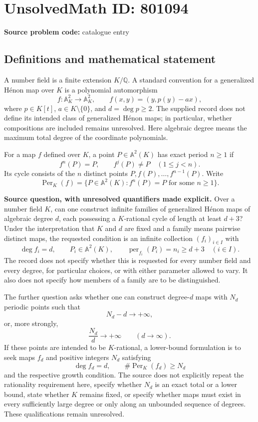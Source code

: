 \documentclass[11pt]{article}
\newcommand{\Q}{\mathbb{Q}}
\newcommand{\A}{\mathbb{A}}
\begin{document}
\section*{UnsolvedMath ID: 801094}
\textbf{Source problem code:} catalogue entry
\subsection{Definitions and mathematical statement}
A number field is a finite extension \(K/\Q\). A standard convention for a generalized H\'{e}non map over \(K\) is a polynomial automorphism
\[
f:\A^2_K\longrightarrow\A^2_K,\qquad f(x,y)=(y,p(y)-ax),
\]
where \(p\in K[t]\), \(a\in K\setminus\{0\}\), and \(d=\deg p\ge 2\). The supplied record does not define its intended class of generalized H\'{e}non maps; in particular, whether compositions are included remains unresolved. Here algebraic degree means the maximum total degree of the coordinate polynomials.

For a map \(f\) defined over \(K\), a point \(P\in\A^2(K)\) has exact period \(n\ge1\) if
\[
f^n(P)=P,\qquad f^j(P)\ne P\quad(1\le j<n).
\]
Its cycle consists of the \(n\) distinct points \(P,f(P),\ldots,f^{n-1}(P)\). Write
\[
\operatorname{Per}_K(f)=\{P\in\A^2(K): f^n(P)=P\text{ for some }n\ge1\}.
\]

\textbf{Source question, with unresolved quantifiers made explicit.} Over a number field \(K\), can one construct infinite families of generalized H\'{e}non maps of algebraic degree \(d\), each possessing a \(K\)-rational cycle of length at least \(d+3\)? Under the interpretation that \(K\) and \(d\) are fixed and a family means pairwise distinct maps, the requested condition is an infinite collection \((f_i)_{i\in I}\) with
\[
\deg f_i=d,\qquad P_i\in\A^2(K),\qquad
\operatorname{per}_{f_i}(P_i)=n_i\ge d+3
\quad(i\in I).
\]
The record does not specify whether this is requested for every number field and every degree, for particular choices, or with either parameter allowed to vary. It also does not specify how members of a family are to be distinguished.

The further question asks whether one can construct degree-\(d\) maps with \(N_d\) periodic points such that
\[
N_d-d\longrightarrow+\infty,
\]
or, more strongly,
\[
\frac{N_d}{d}\longrightarrow+\infty
\qquad(d\longrightarrow\infty).
\]
If these points are intended to be \(K\)-rational, a lower-bound formulation is to seek maps \(f_d\) and positive integers \(N_d\) satisfying
\[
\deg f_d=d,\qquad \#\operatorname{Per}_K(f_d)\ge N_d
\]
and the respective growth condition. The source does not explicitly repeat the rationality requirement here, specify whether \(N_d\) is an exact total or a lower bound, state whether \(K\) remains fixed, or specify whether maps must exist in every sufficiently large degree or only along an unbounded sequence of degrees. These qualifications remain unresolved.
\end{document}

